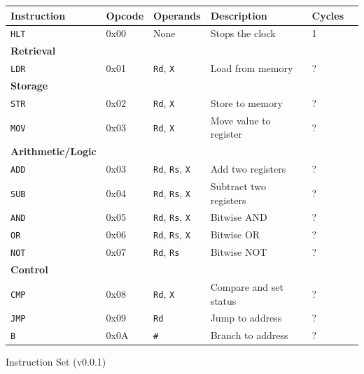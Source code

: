 \documentclass[a4paper,11pt]{article}
\makeatletter
\newenvironment{tablehere}
  {\def\@captype{table}}
  {}
\makeatother
\begin{document}
\begin{tablehere}
  \centering
  \begin{tabular}{@{}llllll@{}}
    \toprule
    \textbf{Instruction}      & \textbf{Opcode} & \textbf{Operands}                    & \textbf{Description}   & \textbf{Cycles} \\
    \midrule
    \texttt{HLT}              & 0x00            & None                                 & Stops the clock        & 1               \\
    \midrule
    \textbf{Retrieval}        &                 &                                      &                        &                 \\
    \texttt{LDR}              & 0x01            & \texttt{Rd}, \texttt{X}              & Load from memory       & ?               \\
    \textbf{Storage}          &                 &                                      &                        &                 \\
    \texttt{STR}              & 0x02            & \texttt{Rd}, \texttt{X}              & Store to memory        & ?               \\
    \texttt{MOV}              & 0x03            & \texttt{Rd}, \texttt{X}              & Move value to register & ?               \\
    \midrule
    \textbf{Arithmetic/Logic} &                 &                                      &                        &                 \\
    \texttt{ADD}              & 0x03            & \texttt{Rd}, \texttt{Rs}, \texttt{X} & Add two registers      & ?               \\
    \texttt{SUB}              & 0x04            & \texttt{Rd}, \texttt{Rs}, \texttt{X} & Subtract two registers & ?               \\
    \texttt{AND}              & 0x05            & \texttt{Rd}, \texttt{Rs}, \texttt{X} & Bitwise AND            & ?               \\
    \texttt{OR}               & 0x06            & \texttt{Rd}, \texttt{Rs}, \texttt{X} & Bitwise OR             & ?               \\
    \texttt{NOT}              & 0x07            & \texttt{Rd}, \texttt{Rs}             & Bitwise NOT            & ?               \\
    \midrule
    \textbf{Control}          &                 &                                      &                        &                 \\
    \texttt{CMP}              & 0x08            & \texttt{Rd}, \texttt{X}              & Compare and set status & ?               \\
    \texttt{JMP}              & 0x09            & \texttt{Rd}                          & Jump to address        & ?               \\
    \texttt{B}                & 0x0A            & \texttt{\#}                          & Branch to address      & ?               \\
    \bottomrule
  \end{tabular}
  \caption{Instruction Set (v0.0.1)}
  \label{tab:Instruction Set}
\end{tablehere}
\end{document}
